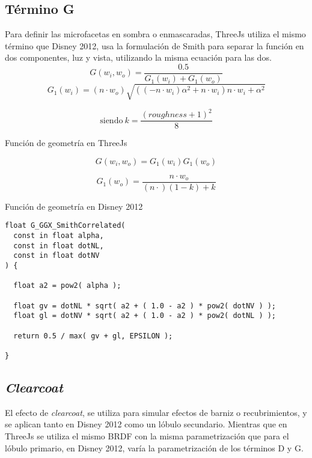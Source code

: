   \subsection*{T\'ermino G}
  Para definir las microfacetas en sombra o enmascaradas, ThreeJs utiliza el mismo t\'ermino que Disney 2012, usa
  la formulaci\'on de Smith para separar la funci\'on en dos componentes, luz y vista, utilizando la misma ecuaci\'on
  para las dos.\\

  $$
  G(w_i, w_o) = \frac{0.5}{G_1(w_i) + G_1(w_o)}
  $$
  \singlespacing
  $$
  G_1(w_i) = (n \cdot{w_o}) \sqrt{((-n\cdot{w_i}) \alpha^2 + n\cdot{w_i}) n\cdot{w_i} + \alpha^2}
  $$
  \begin{eqfloat}[!htb]
    \begin{equation}
      \textrm{siendo}\ k = \frac{(roughness + 1)^2}{8}
    \end{equation}
  \caption{Funci\'on de geometr\'ia en ThreeJs}
  \end{eqfloat}
  \singlespacing

  $$
  G(w_i, w_o) = G_1(w_i)G_1(w_o)
  $$

  \begin{eqfloat}[!htb]
    \begin{equation}
      G_1(w_o) = \frac{n\cdot{w_o}}{(n\cdot) (1 - k) + k}
    \end{equation}
  \caption{Funci\'on de geometr\'ia en Disney 2012}
  \end{eqfloat}
  \singlespacing

\begin{lstlisting}[caption=Clase MeshClothMaterial]
float G_GGX_SmithCorrelated(
  const in float alpha,
  const in float dotNL,
  const in float dotNV
) {

  float a2 = pow2( alpha );

  float gv = dotNL * sqrt( a2 + ( 1.0 - a2 ) * pow2( dotNV ) );
  float gl = dotNV * sqrt( a2 + ( 1.0 - a2 ) * pow2( dotNL ) );

  return 0.5 / max( gv + gl, EPSILON );

}
\end{lstlisting}

  \subsection*{\textit{Clearcoat}}
  El efecto de \textit{clearcoat}, se utiliza para simular efectos de barniz o recubrimientos, y se aplican tanto en Disney
  2012 como un l\'obulo secundario. Mientras que en ThreeJs se utiliza el mismo BRDF con la misma parametrizaci\'on que para
  el l\'obulo primario, en Disney 2012, var\'ia la parametrizaci\'on de los t\'erminos D y G.\\


